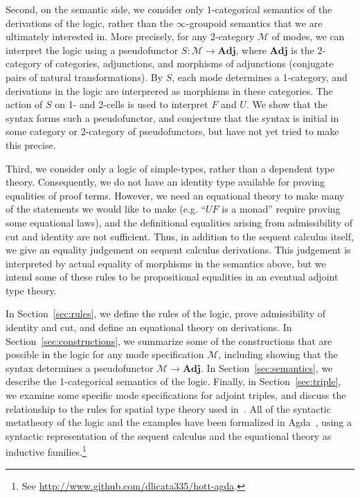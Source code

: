 \documentclass{drl-common/llncs}
\newcommand{\M}{\ensuremath{\mathcal{M}}}
\newcommand{\Adj}{\textbf{Adj}}
\begin{document}
Second, on the semantic side, we consider only 1-categorical semantics
of the derivations of the logic, rather than the $\infty$-groupoid
semantics that we are ultimately interested in.  More precisely, for any
2-category \M\/ of modes, we can interpret the logic using a
pseudofunctor $S : \M \to \Adj$, where $\Adj$ is the 2-category of
categories, adjunctions, and morphisms of adjunctions (conjugate pairs
of natural transformations).  By $S$, each mode determines a 1-category,
and derivations in the logic are interprered as morphisms in these
categories.  The action of $S$ on 1- and 2-cells is used to interpret
$F$ and $U$.  We show that the syntax forms such a pseudofunctor, and
conjecture that the syntax is initial in some category or 2-category of
pseudofunctors, but have not yet tried to make this precise.

Third, we consider only a logic of simple-types, rather than a dependent
type theory.  Consequently, we do not have an identity type available
for proving equalities of proof terms.  However, we need an equational
theory to make many of the statements we would like to make (e.g. ``$UF$ is a monad''
require proving some equational laws), and the definitional equalities
arising from admissibility of cut and identity are not sufficient.
Thus, in addition to the sequent calculus itself, we give an equality
judgement on sequent calculus derivations.  This judgement is
interpreted by actual equality of morphisms in the semantics above, but
we intend some of these rules to be propositional equalities in an eventual
adjoint type theory.

In Section~\ref{sec:rules}, we define the rules of the logic, prove
admissibility of identity and cut, and define an equational theory on
derivations.  In Section~\ref{sec:constructions}, we summarize some of
the constructions that are possible in the logic for any mode
specification \M, including showing that the syntax determines a
pseudofunctor $\M \to \Adj$.  In Section~\ref{sec:semantics}, we
describe the 1-categorical semantics of the logic.  Finally, in
Section~\ref{sec:triple}, we examine some specific mode specifications
for adjoint triples, and discuss the relationship to the rules for
spatial type theory used in~\citep{shulman15realcohesion}.  All of the
syntactic metatheory of the logic and the examples have been formalized
in Agda~\citep{norell07thesis}, using a syntactic representation of the
sequent calculus and the equational theory as inductive
families.\footnote{See \url{http://www.github.com/dlicata335/hott-agda}.}
\end{document}
